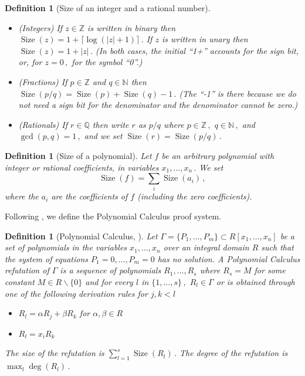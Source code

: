 \documentclass[11pt]{article}
\newtheorem{definition}[theorem]{Definition}
\newcommand{\Q}{{\mathbb Q}}
\newcommand{\Z}{{\mathbb Z}}
\newcommand{\N}{{\mathbb N}}
\DeclareMathOperator{\Size}{\mathrm{Size}}
\begin{document}
\begin{definition}[Size of an integer and a rational number]
  \label{def:IntegerSize}
\leavevmode   
\begin{itemize} 
\item (Integers) If $z \in \Z$ is written in binary then 
$\Size(z) = 1+ \lceil \log(|z|+1)\rceil\,.$ %
If $z$ is written in unary then %
$\Size(z)=1+|z|\,.$ %
(In both cases, the initial ``1+'' accounts for the sign bit, or, for %
$z=0\,,$ %
for the symbol ``0''.)
\item (Fractions) If $p\in\Z$ and $q\in \N$ then %
$\Size(p/q)=\Size(p)+\Size(q)-1\,.$ %
(The ``-1'' is there because we do not need a sign bit for the denominator
and the denominator cannot be zero.)  
\item (Rationals) If $r\in\Q$ then write $r$ as $p/q$ where %
$p\in\Z\,,$ %
$q\in\N\,,$ %
  and %
$\gcd(p,q)=1\,,$ %
 and we set %
$\Size(r)=\Size(p/q)\,.$ %
\end{itemize}
\end{definition}  %

\begin{definition} [Size of a polynomial]\label{def:PolynomialSize}
Let $f$ be an arbitrary %
polynomial with integer or rational coefficients, in variables 
%
%
%
$x_1, \ldots, x_n\,.$ %
%
%
%
%
%
%
%
%
%
%
We set
%
$$ \Size(f) = \sum_i \Size(a_i)\,,$$ %
where the $a_i$ are the coefficients of $f$ (including the zero coefficients).  %
\end{definition}

Following  \cite{CEI96}, we define the Polynomial Calculus proof system.

\begin{definition}[Polynomial Calculus, \cite{CEI96}]\label{def:PC}
Let $\Gamma = \{P_1, \ldots, P_m\} \subset R[x_1, \ldots, x_n]$ be a set of polynomials in
the variables %
%
$x_1, \ldots, x_n$  %
%
over an integral domain $R$  such that the system of equations $P_1 = 0, \ldots, P_m = 0$ has no solution. A Polynomial Calculus refutation of $\Gamma$ is a sequence of polynomials $R_1, \ldots, R_s$ where $R_s = M$ for some constant $M \in R \backslash \{0\}$  and for every $l$ in %
$\{1, \ldots, s\}\,,$ %
 $R_l \in \Gamma$ or is obtained through one of the following derivation rules for $j, k < l$
\begin{itemize}
    \item $R_l = \alpha R_j + \beta R_k$ for $\alpha, \beta \in R$
    \item $R_l = x_i R_k$
\end{itemize}
The size of the refutation is %
$\sum_{l = 1}^s \Size(R_l)\,.$ %
 The degree of the refutation is
%
%
$\max_l \deg(R_l)\,.$ %
%
\end{definition}
\end{document}
